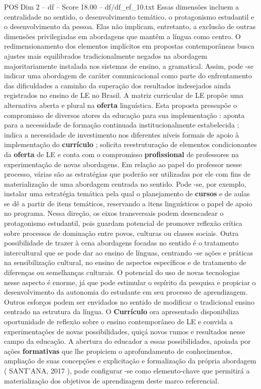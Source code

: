 \begin{textsample}{POS Dim 2 – df – Score 18.00 – df/df\_ef\_10.txt}
Essas dimensões incluem a centralidade no sentido, o desenvolvimento temático, o protagonismo estudantil e o desenvolvimento da pessoa.
Elas não implicam, entretanto, a exclusão de outras dimensões privilegiadas em abordagens que mantêm a língua como centro.
O redimensionamento dos elementos implícitos em propostas contemporâneas busca ajustes mais equilibrados tradicionalmente negados na abordagem majoritariamente instalada nos sistemas de ensino, a gramatical.
Assim, pode -se indicar uma abordagem de caráter comunicacional como parte do enfrentamento das dificuldades a caminho da superação dos resultados indesejados ainda registrados no ensino de LE no Brasil.
A matriz curricular de LE propõe uma alternativa aberta e plural na \textbf{oferta} linguística.
Esta proposta pressupõe o compromisso de diversos atores da educação para sua implementação : aponta para a necessidade de formação continuada institucionalmente estabelecida ; indica a necessidade de investimento nos diferentes níveis formais de apoio à implementação do \textbf{currículo} ; solicita reestruturação de elementos condicionantes da \textbf{oferta} de LE e conta com o compromisso \textbf{profissional} de professores na experimentação de novas abordagens.
Em relação ao papel do professor nesse processo, várias são as estratégias que poderão ser utilizadas por ele com fins de materialização de uma abordagem centrada no sentido.
Pode -se, por exemplo, instalar uma estratégia temática pela qual o planejamento de \textbf{cursos} e de aulas se dê a partir de itens temáticos, reservando a itens linguísticos o papel de apoio no programa.
Nessa direção, os eixos transversais podem desencadear o protagonismo estudantil, pois guardam potencial de promover reflexão crítica sobre processos de dominação entre povos, culturas ou classes sociais.
Outra possibilidade de trazer à cena abordagens focadas no sentido é o tratamento intercultural que se pode dar ao ensino de línguas, centrando -se ações e práticas na sensibilização cultural, no ensino de aspectos específicos e de tratamento de diferenças ou semelhanças culturais.
O potencial do uso de novas tecnologias nesse aspecto é enorme, já que pode estimular o espírito da pesquisa e propiciar o desenvolvimento da autonomia do estudante em seu processo de aprendizagem.
Outros esforços podem ser envidados no sentido de modificar o tradicional ensino centrado na estrutura da língua.
O \textbf{Currículo} ora apresentado disponibiliza oportunidade de reflexão sobre o ensino contemporâneo de LE e convida a experimentações de novas possibilidades, quiçá novos rumos e resultados nesse campo da educação.
A abertura do educador a essas possibilidades, apoiada por ações \textbf{formativas} que lhe propiciem o aprofundamento de conhecimentos, ampliação de suas concepções e explicitação e formalização da própria abordagem ( SANT’ANA, 2017 ), pode configurar -se como elemento-chave que permitirá a materialização dos objetivos de aprendizagem deste marco referencial.

\end{textsample}
